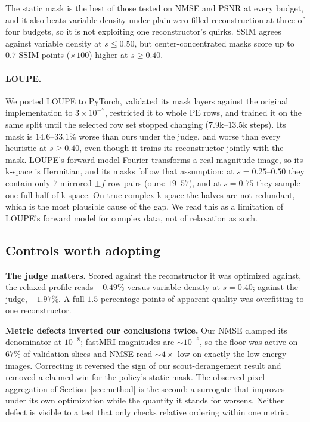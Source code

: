 \documentclass{article}
\begin{document}
The static mask is the best of those tested on NMSE and PSNR at every budget, and it also beats variable density under plain zero-filled reconstruction at three of four budgets, so it is not exploiting one reconstructor's quirks. SSIM agrees against variable density at $s \le 0.50$, but center-concentrated masks score up to $0.7$ SSIM points ($\times 100$) higher at $s \ge 0.40$.

\paragraph{LOUPE.}
We ported LOUPE \citep{bahadir2020loupe} to PyTorch, validated its mask layers against the original implementation to $3 \times 10^{-7}$, restricted it to whole PE rows, and trained it on the same split until the selected row set stopped changing ($7.9$k--$13.5$k steps). Its mask is $14.6$--$33.1\%$ worse than ours under the judge, and worse than every heuristic at $s \ge 0.40$, even though it trains its reconstructor jointly with the mask. LOUPE's forward model Fourier-transforms a real magnitude image, so its k-space is Hermitian, and its masks follow that assumption: at $s = 0.25$--$0.50$ they contain only $7$ mirrored $\pm f$ row pairs (ours: $19$--$57$), and at $s = 0.75$ they sample one full half of k-space. On true complex k-space the halves are not redundant, which is the most plausible cause of the gap. We read this as a limitation of LOUPE's forward model for complex data, not of relaxation as such.

\subsection{Controls worth adopting}
\textbf{The judge matters.} Scored against the reconstructor it was optimized against, the relaxed profile reads $-0.49\%$ versus variable density at $s = 0.40$; against the judge, $-1.97\%$. A full $1.5$ percentage points of apparent quality was overfitting to one reconstructor.

\textbf{Metric defects inverted our conclusions twice.} Our NMSE clamped its denominator at $10^{-8}$; fastMRI magnitudes are ${\sim}10^{-6}$, so the floor was active on $67\%$ of validation slices and NMSE read ${\sim}4\times$ low on exactly the low-energy images. Correcting it reversed the sign of our scout-derangement result and removed a claimed win for the policy's static mask. The observed-pixel aggregation of Section~\ref{sec:method} is the second: a surrogate that improves under its own optimization while the quantity it stands for worsens. Neither defect is visible to a test that only checks relative ordering within one metric.
\end{document}
